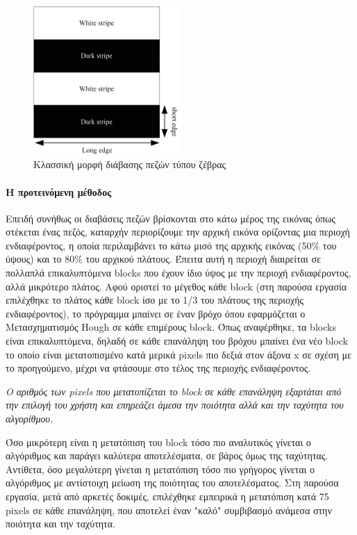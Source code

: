 \begin{figure}[H]
    \centering
    \includegraphics[width=0.5\textwidth]{images/zebra_crossing.jpg}
    \caption{Κλασσική μορφή διάβασης πεζών τύπου ζέβρας \cite{wu_block-based_2019}}
    \label{fig:zebra-crossing}
\end{figure}

\paragraph{Η προτεινόμενη μέθοδος}
Επειδή συνήθως οι διαβάσεις πεζών βρίσκονται στο κάτω μέρος της εικόνας όπως στέκεται ένας πεζός, καταρχήν περιορίζουμε την αρχική εικόνα ορίζοντας μια περιοχή ενδιαφέροντος, η οποία περιλαμβάνει το κάτω μισό της αρχικής εικόνας (50\% του ύψους) και το 80\% του αρχικού πλάτους. Έπειτα αυτή η περιοχή διαιρείται σε πολλαπλά επικαλυπτόμενα blocks που έχουν ίδιο ύψος με την περιοχή ενδιαφέροντος, αλλά μικρότερο πλάτος. Αφού οριστεί το μέγεθος κάθε block (στη παρούσα εργασία επιλέχθηκε το πλάτος κάθε block ίσο με το 1/3 του πλάτους της περιοχής ενδιαφέροντος), το πρόγραμμα μπαίνει σε έναν βρόχο όπου εφαρμόζεται ο Μετασχηματισμός Hough σε κάθε επιμέρους block. Όπως αναφέρθηκε, τα blocks είναι επικαλυπτόμενα, δηλαδή σε κάθε επανάληψη του βρόχου μπαίνει ένα νέο block το οποίο είναι μετατοπισμένο κατά μερικά pixels πιο δεξιά στον άξονα x σε σχέση με το προηγούμενο, μέχρι να φτάσουμε στο τέλος της περιοχής ενδιαφέροντος.
\begin{displayquote}
\emph{Ο αριθμός των pixels που μετατοπίζεται το block σε κάθε επανάληψη εξαρτάται από την επιλογή του χρήστη και επηρεάζει άμεσα την ποιότητα αλλά και την ταχύτητα του αλγορίθμου.}
\end{displayquote}
Όσο μικρότερη είναι η μετατόπιση του block τόσο πιο αναλυτικός γίνεται ο αλγόριθμος και παράγει καλύτερα αποτελέσματα, σε βάρος όμως της ταχύτητας. Αντίθετα, όσο μεγαλύτερη γίνεται η μετατόπιση τόσο πιο γρήγορος γίνεται ο αλγόριθμος με αντίστοιχη μείωση της ποιότητας του αποτελέσματος. Στη παρούσα εργασία, μετά από αρκετές δοκιμές, επιλέχθηκε εμπειρικά η μετατόπιση κατά 75 pixels σε κάθε επανάληψη, που αποτελεί έναν "καλό" συμβιβασμό ανάμεσα στην ποιότητα και την ταχύτητα.

